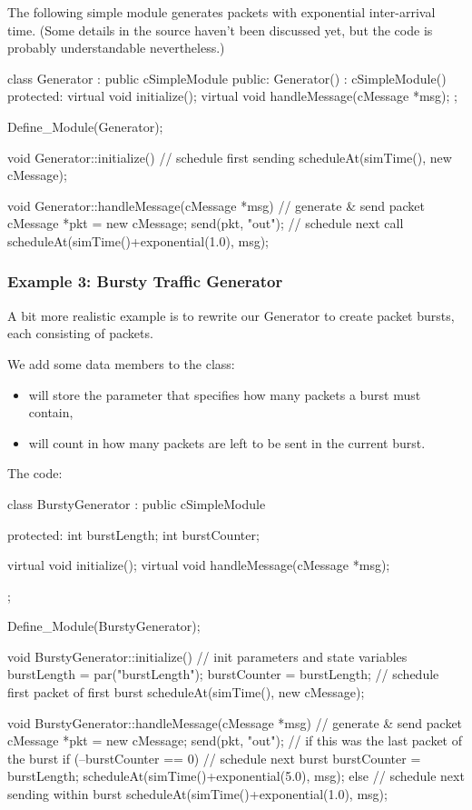 The following simple module generates packets with exponential
inter-arrival time. (Some details in the source haven't been
discussed yet, but the code is probably understandable nevertheless.)


\begin{cpp}
class Generator : public cSimpleModule
{
  public:
    Generator() : cSimpleModule() {}
  protected:
    virtual void initialize();
    virtual void handleMessage(cMessage *msg);
};

Define_Module(Generator);

void Generator::initialize()
{
    // schedule first sending
    scheduleAt(simTime(), new cMessage);
}

void Generator::handleMessage(cMessage *msg)
{
    // generate & send packet
    cMessage *pkt = new cMessage;
    send(pkt, "out");
    // schedule next call
    scheduleAt(simTime()+exponential(1.0), msg);
}
\end{cpp}



\subsubsection{Example 3: Bursty Traffic Generator}


A bit more realistic example is to rewrite our Generator to create
packet bursts, each consisting of  packets.

We add some data members to the class:
\begin{itemize}
\item{ will store the parameter that specifies how many
    packets a burst must contain,}
\item{ will count in how many packets are left to be sent
    in the current burst.}
\end{itemize}

The code:

\begin{cpp}
class BurstyGenerator : public cSimpleModule
{
  protected:
    int burstLength;
    int burstCounter;

    virtual void initialize();
    virtual void handleMessage(cMessage *msg);
};

Define_Module(BurstyGenerator);

void BurstyGenerator::initialize()
{
    // init parameters and state variables
    burstLength = par("burstLength");
    burstCounter = burstLength;
    // schedule first packet of first burst
    scheduleAt(simTime(), new cMessage);
}

void BurstyGenerator::handleMessage(cMessage *msg)
{
    // generate & send packet
    cMessage *pkt = new cMessage;
    send(pkt, "out");
    // if this was the last packet of the burst
    if (--burstCounter == 0)
    {
        // schedule next burst
        burstCounter = burstLength;
        scheduleAt(simTime()+exponential(5.0), msg);
    }
    else
    {
        // schedule next sending within burst
        scheduleAt(simTime()+exponential(1.0), msg);
    }
}
\end{cpp}



